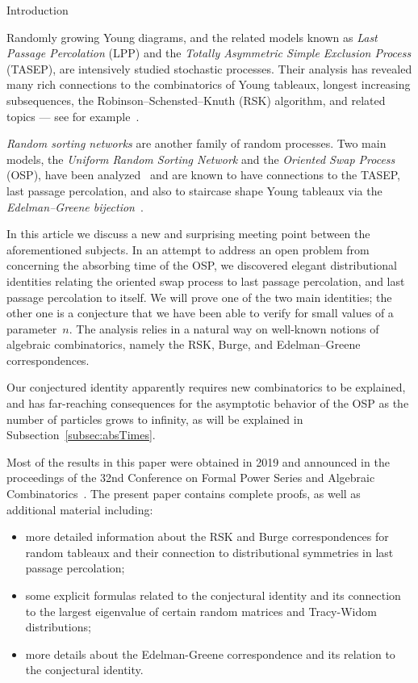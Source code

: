 \documentclass[a4paper,reqno,12pt]{amsart}
\makeatletter
\theoremstyle{plain}
\theoremstyle{definition}
\renewcommand\section{\@startsection{section}{1}%
\z@{.7\linespacing\@plus\linespacing}{.5\linespacing}%
{\large\bfseries\scshape\centering}}
\newcommand{\firstmention}{\emph}
\newcommand{\1}{\mathbbm{1}}
\makeatother
\begin{document}
\section{Introduction}
\label{sec:intro}

Randomly growing Young diagrams, and the related models known as \firstmention{Last Passage Percolation} (LPP) and the \firstmention{Totally Asymmetric Simple Exclusion Process} (TASEP), are intensively studied stochastic processes.
Their analysis has revealed many rich connections to the combinatorics of Young tableaux, longest increasing subsequences, the Robinson--Schensted--Knuth (RSK) algorithm, and related topics --- see for example~\cite[Chs.~4-5]{romik15}.

\firstmention{Random sorting networks} are another family of random processes.
Two main models, the \firstmention{Uniform Random Sorting Network} and the \firstmention{Oriented Swap Process} (OSP), have been analyzed~\cite{angelDauvergneEtAl17, angelHolroydRomikVirag07, angelHolroydRomik09, dauvergne18, dauvergneVirag18} and are known to have connections to the TASEP, last passage percolation, and also to staircase shape Young tableaux via the \firstmention{Edelman--Greene bijection}~\cite{edelmanGreene87}.

In this article we discuss a new and surprising meeting point between the aforementioned subjects.
In an attempt to address an open problem from~\cite{angelHolroydRomik09} concerning the absorbing time of the OSP, we discovered elegant distributional identities relating the oriented swap process to last passage percolation, and last passage percolation to itself.
We will prove one of the two main identities; the other one is a conjecture that we have been able to verify for small values of a parameter~$n$.
The analysis relies in a natural way on well-known notions of algebraic combinatorics, namely the RSK, Burge, and Edelman--Greene correspondences.

Our conjectured identity apparently requires new combinatorics to be explained, and has far-reaching consequences for the asymptotic behavior of the OSP as the number of particles grows to infinity, as will be explained in Subsection~\ref{subsec:absTimes}.

Most of the results in this paper were obtained in 2019 and announced in the proceedings of the 32nd Conference on Formal Power Series and Algebraic Combinatorics~\cite{bisiEtAl20}.
The present paper contains complete proofs, as well as additional material including:
\begin{itemize}
\item more detailed information about the RSK and Burge correspondences for random tableaux and their connection to distributional symmetries in last passage percolation;
\item some explicit formulas related to the conjectural identity and its connection to the largest eigenvalue of certain random matrices and Tracy-Widom distributions;
\item more details about the Edelman-Greene correspondence and its relation to the conjectural identity.
\end{itemize}
\end{document}
